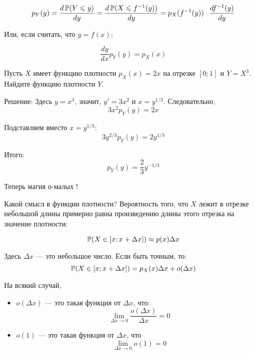 \[ p_{Y}(y)=\frac{d\P(Y\leq y)}{dy}=\frac{d\P(X\leq f^{-1}(y))}{dy}=p_{X}(f^{-1}(y))\cdot \frac{df^{-1}(y)}{dy} \]

Или, если считать, что $ y=f(x) $:

\begin{equation}
\frac{dy}{dx}p_{Y}(y)=p_{X}(x)
\end{equation}

\begin{myex} Пусть $ X $ имеет функцию плотности $ p_{X}(x)=2x $ на отрезке $ [0;1] $ и $ Y=X^{3} $. Найдите функцию плотности $ Y $.

Решение: Здесь $ y=x^{3} $, значит, $ y'=3x^{2} $ и $ x=y^{1/3} $. Следовательно,
\begin{equation}
3x^{2}p_{Y}(y)=2x
\end{equation}

Подставляем вместо $ x=y^{1/3} $:
\begin{equation}
3y^{2/3}p_{Y}(y)=2y^{1/3}
\end{equation}

Итого:
\begin{equation}
p_{Y}(y)=\frac{2}{3}y^{-1/3}
\end{equation}
\end{myex}

Теперь магия о-малых !

Какой смысл в функции плотности? Вероятность того, что $ X $ лежит в отрезке небольшой длины примерно равна произведению длины этого отрезка на значение плотности:

\begin{equation}
\P(X\in [x;x+\Delta x])\approx p(x)\Delta x
\end{equation}

Здесь $ \Delta x $ — это небольшое число. Если быть точным, то:
\begin{equation}
\P(X\in [x;x+\Delta x])=p_{X}(x)\Delta x+o(\Delta x)
\end{equation}


На всякий случай,
\begin{itemize}
\item $ o(\Delta x) $ — это такая функция от $ \Delta x $, что:
\begin{equation}
\lim_{\Delta x\to 0} \frac{o(\Delta x)}{\Delta x}=0
\end{equation}
\item $ o(1) $ — это такая функция от $ \Delta x $, что
\begin{equation}
\lim_{\Delta x \to 0} o(1)=0
\end{equation}


\end{itemize}




